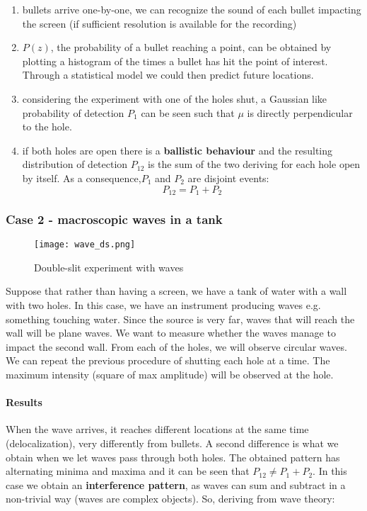    \begin{multicols}{2}
      \begin{enumerate}
          \item bullets arrive one-by-one, we can recognize the sound of each bullet impacting the screen (if sufficient resolution is available for the recording)
          \item $P(z)$, the probability of a bullet reaching a point, can be obtained by plotting a histogram of the times a bullet has hit the point of interest. Through a statistical model we could then predict future locations.
          \item considering the experiment with one of the holes shut, a Gaussian like probability of detection $P_1$ can be seen such that $\mu$ is directly perpendicular to the hole.
          \item if both holes are open there is a \textbf{ballistic behaviour} and the resulting distribution of detection $P_{12}$ is the sum of the two deriving for each hole open by itself. As a consequence,$P_1$ and $P_2$ are disjoint events: $$P_{12} = P_1+P_2$$
      \end{enumerate}
    \end{multicols}

   \subsubsection{Case 2 - macroscopic waves in a tank}

   \begin{figure}[h!]
     \centering
     \texttt{[image: wave\_ds.png]}
     \caption{\label{fig:wave_ds} Double-slit experiment with waves}
   \end{figure}

     Suppose that rather than having a screen, we have a tank of water with a wall with two holes.
     In this case, we have an instrument producing waves e.g. something touching water.
     Since the source is very far, waves that will reach the wall will be plane waves.
     We want to measure whether the waves manage to impact the second wall.
     From each of the holes, we will observe circular waves.
     We can repeat the previous procedure of shutting each hole at a time.
     The maximum intensity (square of max amplitude) will be observed at the hole.

        \paragraph{Results}
        When the wave arrives, it reaches different locations at the same time (delocalization), very differently from bullets.
        A second difference is what we obtain when we let waves pass through both holes.
        The obtained pattern has alternating minima and maxima and it can be seen that $P_{12} \neq P_1+P_2$.
        In this case we obtain an \textbf{interference pattern}, as waves can sum and subtract in a non-trivial way (waves are complex objects).
        So, deriving from wave theory:

